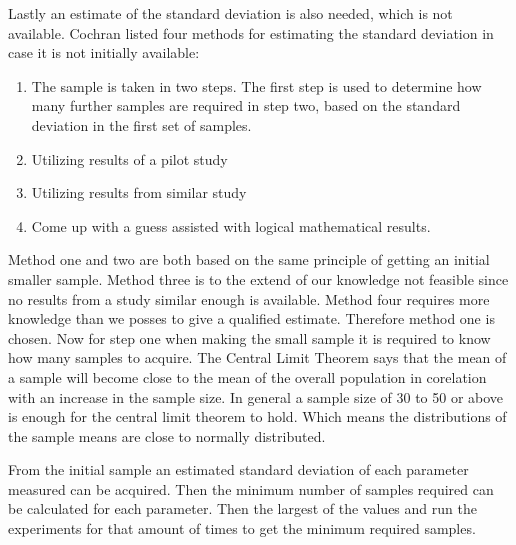Lastly an estimate of the standard deviation is also needed, which is not available. Cochran listed four methods for estimating the standard deviation in case it is not initially available:
\begin{enumerate}
    \item The sample is taken in two steps. The first step is used to determine how many further samples are required in step two, based on the standard deviation in the first set of samples.
    \item Utilizing results of a pilot study
    \item Utilizing results from similar study
    \item Come up with a guess assisted with logical mathematical results.
\end{enumerate}


Method one and two are both based on the same principle of getting an initial smaller sample. Method three is to the extend of our knowledge not feasible since no results from a study similar enough is available. Method four requires more knowledge than we posses to give a qualified estimate. Therefore method one is chosen. Now for step one when making the small sample it is required to know how many samples to acquire. The Central Limit Theorem says that the mean of a sample will become close to the mean of the overall population in corelation with an increase in the sample size. In general a sample size of 30 to 50 or above is enough for the central limit theorem to hold. Which means the distributions of the sample means are close to normally distributed.


From the initial sample an estimated standard deviation of each parameter measured can be acquired. Then the minimum number of samples required can be calculated for each parameter. Then the largest of the values and run the experiments for that amount of times to get the minimum required samples.



